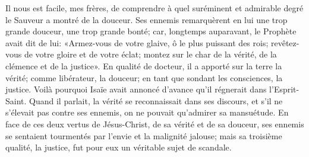 Il nous est facile, mes frères,
	de comprendre à quel suréminent et admirable degré le Sauveur a montré de la douceur.
Ses ennemis remarquèrent en lui une trop grande douceur, une trop grande bonté;
	car, longtemps auparavant, le Prophète avait dit de lui:
	«Armez-vous de votre glaive, ô le plus puissant des rois;
	revêtez-vous de votre gloire et de votre éclat;
	montez sur le char de la vérité, de la clémence et de la justice».
En qualité de docteur, il a apporté sur la terre la vérité;
	comme libérateur, la douceur;
	en tant que sondant les consciences, la justice.
Voilà pourquoi Isaïe avait annoncé d’avance qu’il régnerait dans l’Esprit-Saint.
Quand il parlait, la vérité se reconnaissait dans ses discours,
	et s’il ne s’élevait pas contre ses ennemis, on ne pouvait qu’admirer sa mansuétude.
En face de ces deux vertus de Jésus-Christ, de sa vérité et de sa douceur,
	ses ennemis se sentaient tourmentés par l’envie et la malignité jalouse;
mais sa troisième qualité, la justice,
	fut pour eux un véritable sujet de scandale.
